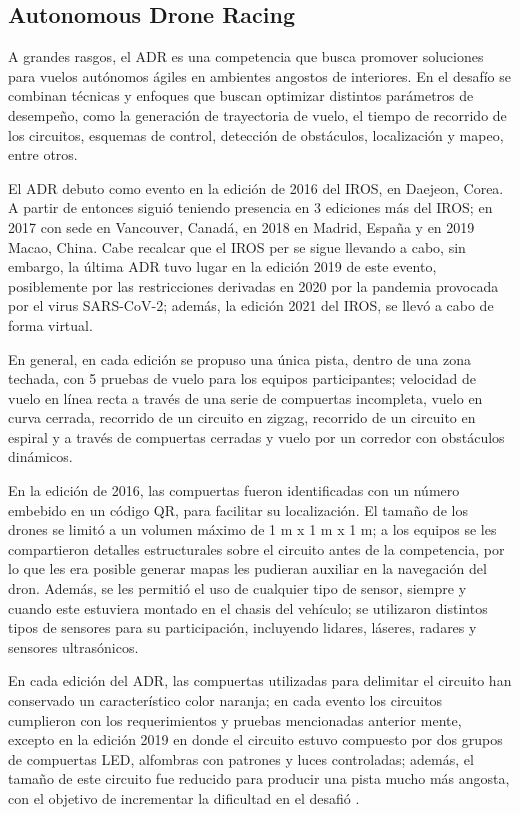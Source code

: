 \subsection{Autonomous Drone Racing}
A grandes rasgos, el ADR es una competencia que busca promover soluciones para vuelos autónomos ágiles en ambientes angostos de interiores. En el desafío se combinan técnicas y enfoques que buscan optimizar distintos parámetros de desempeño, como la generación de trayectoria de vuelo, el tiempo de recorrido de los circuitos, esquemas de control, detección de obstáculos, localización y mapeo, entre otros. 

El ADR debuto como evento en la edición de 2016 del IROS, en Daejeon, Corea. A partir de entonces siguió teniendo presencia en 3 ediciones más del IROS; en 2017 con sede en Vancouver, Canadá, en 2018 en Madrid, España y en 2019 Macao, China. Cabe recalcar que el IROS per se sigue llevando a cabo, sin embargo, la última ADR tuvo lugar en la edición 2019 de este evento, posiblemente por las restricciones derivadas en 2020 por la pandemia provocada por el virus SARS-CoV-2; además, la edición 2021 del IROS, se llevó a cabo de forma virtual.  

En general, en cada edición se propuso una única pista, dentro de una zona techada, con 5 pruebas de vuelo para los equipos participantes; velocidad de vuelo en línea recta a través de una serie de compuertas incompleta, vuelo en curva cerrada, recorrido de un circuito en zigzag, recorrido de un circuito en espiral y a través de compuertas cerradas y vuelo por un corredor con obstáculos dinámicos. 

En la edición de 2016, las compuertas fueron identificadas con un número embebido en un código QR, para facilitar su localización. El tamaño de los drones se limitó a un volumen máximo de  1 m x 1 m x 1 m; a los equipos se les compartieron detalles estructurales sobre el circuito antes de la competencia, por lo que les era posible generar mapas les pudieran auxiliar en la navegación del dron. Además, se les permitió el uso de cualquier tipo de sensor, siempre y cuando este estuviera montado en el chasis del vehículo; se utilizaron distintos tipos de sensores para su participación, incluyendo lidares, láseres, radares y sensores ultrasónicos.

En cada edición del ADR, las compuertas utilizadas para delimitar el circuito han conservado un característico color naranja; en cada evento los circuitos cumplieron con los requerimientos y pruebas mencionadas anterior mente, excepto en la edición 2019 en donde el circuito estuvo compuesto por dos grupos de compuertas LED, alfombras con patrones y luces controladas; además, el tamaño de este circuito fue reducido para producir una pista mucho más angosta, con el objetivo de incrementar la dificultad en el desafió \cite{rojas2021board}.   

